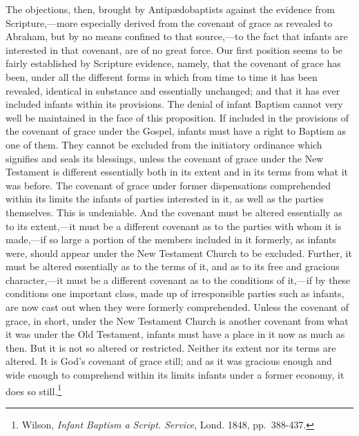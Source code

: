 \documentclass[]{book}
\begin{document}
The objections, then, brought by Antipædobaptists against the evidence from Scripture,---more especially derived from the covenant of grace as revealed to Abraham, but by no means confined to that source,---to the fact that infants are interested in that covenant, are of no great force. Our first position seems to be fairly established by Scripture evidence, namely, that the covenant of grace has been, under all the different forms in which from time to time it has been revealed, identical in substance and essentially unchanged; and that it has ever included infants within its provisions. The denial of infant Baptism cannot very well be maintained in the face of this proposition. If included in the provisions of the covenant of grace under the Gospel, infants must have a right to Baptism as one of them. They cannot be excluded from the initiatory ordinance which signifies and seals its blessings, unless the covenant of grace under the New Testament is different essentially both in its extent and in its terms from what it was before. The covenant of grace under former dispensations comprehended within its limits the infants of parties interested in it, as well as the parties themselves. This is undeniable. And the covenant must be altered essentially as to its extent,---it must be a different covenant as to the parties with whom it is made,---if so large a portion of the members included in it formerly, as infants were, should appear under the New Testament Church to be excluded. Further, it must be altered essentially as to the terms of it, and as to its free and gracious character,---it must be a different covenant as to the conditions of it,---if by these conditions one important class, made up of irresponsible parties such as infants, are now cast out when they were formerly comprehended. Unless the covenant of grace, in short, under the New Testament Church is another covenant from what it was under the Old Testament, infants must have a place in it now as much as then. But it is not so altered or restricted. Neither its extent nor its terms are altered. It is God's covenant of grace still; and as it was gracious enough and wide enough to comprehend within its limits infants under a former economy, it does so still.\footnote{Wilson, \emph{Infant Baptism a Script. Service}, Lond. 1848, pp.~388-437.}
\end{document}
